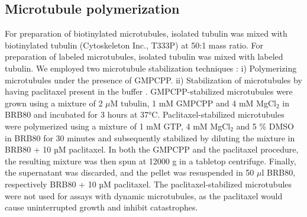 \subsection{Microtubule polymerization}
For preparation of biotinylated microtubules, isolated tubulin was mixed with biotinylated tubulin (Cytoskeleton Inc., T333P) at 50:1 mass ratio. For preparation of labeled microtubules, isolated tubulin was mixed with labeled tubulin. We employed two microtubule stabilization techniques : i) Polymerizing microtubules under the presence of GMPCPP. ii) Stabilization of microtubules by having paclitaxel present in the buffer \parencite{SCHIFF1979}. GMPCPP-stabilized microtubules were grown using a mixture of 2 $\mu$M tubulin, 1 mM GMPCPP and 4 mM MgCl$_2$ in BRB80 and incubated for 3 hours at 37°C. Paclitaxel-stabilized microtubules were polymerized using a mixture of 1 mM GTP, 4 mM MgCl$_2$ and 5 \% DMSO in BRB80 for 30 minutes and subsequently stabilized by diluting the mixture in BRB80 + 10 µM paclitaxel. In both the GMPCPP and the paclitaxel procedure, the resulting mixture was then spun at 12000 g in a tabletop centrifuge. Finally, the supernatant was discarded, and the pellet was resuspended in 50 $\mu$l BRB80, respectively BRB80 + 10 µM paclitaxel. The paclitaxel-stabilized microtubules were not used for assays with dynamic microtubules, as the paclitaxel would cause uninterrupted growth and inhibit catastrophes.

